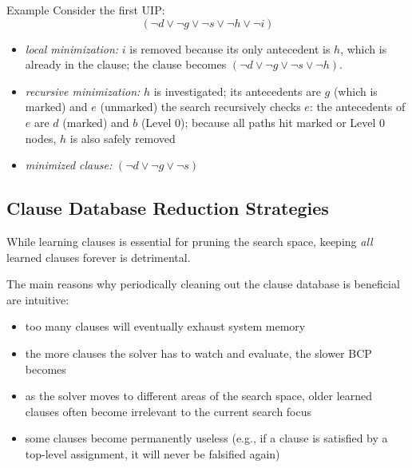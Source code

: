 \documentclass[a4paper, 11pt]{report}
\begin{document}
\begin{gframe}{Example}
    Consider the first UIP:
 $$(\neg d \lor \neg g \lor \neg s \lor \neg h \lor \neg i)$$
 \begin{itemize}
\item \textit{local minimization:} $i$ is removed because its only antecedent is $h$, which is already in the clause; the clause becomes $(\neg d \lor \neg g \lor \neg s \lor \neg h)$.
    \item \textit{recursive minimization:} $h$ is investigated; its antecedents are $g$ (which is marked) and $e$ (unmarked)
        \subitem the search recursively checks $e$: the antecedents of $e$ are $d$ (marked) and $b$ (Level 0); because all paths hit marked or Level 0 nodes, $h$ is also safely removed
    \item \textit{minimized clause:} $(\neg d \lor \neg g \lor \neg s)$
\end{itemize}
\end{gframe}

\subsection{Clause Database Reduction Strategies}
While learning clauses is essential for pruning the search space, keeping \textit{all} learned clauses forever is detrimental.

The main reasons why periodically cleaning out the clause database is beneficial are intuitive:
\begin{itemize}
    \item too many clauses will eventually exhaust system memory
    \item the more clauses the solver has to watch and evaluate, the slower BCP becomes
    \item as the solver moves to different areas of the search space, older learned clauses often become irrelevant to the current search focus
    \item some clauses become permanently useless (e.g., if a clause is satisfied by a top-level assignment, it will never be falsified again)
\end{itemize}
\end{document}
